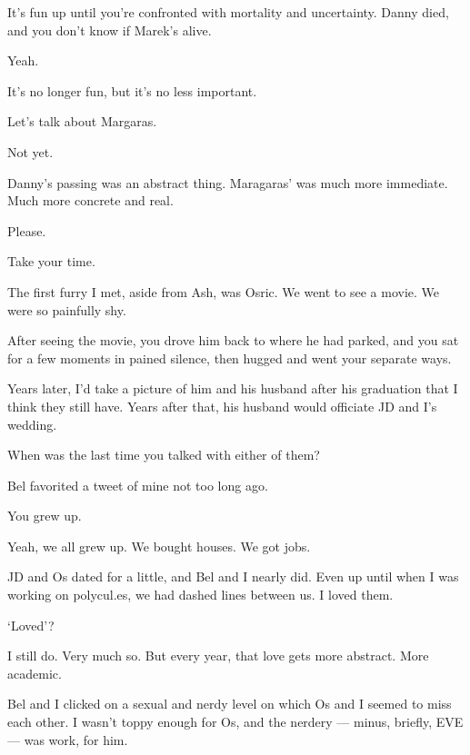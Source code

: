 \begin{leftcolumn}
\begin{ally}
It's fun up until you're confronted with mortality and uncertainty. Danny died, and you don't know if Marek's alive.
\end{ally}
Yeah.

It's no longer fun, but it's no less important.

\begin{ally}
Let's talk about Margaras.
\end{ally}
Not yet.

\begin{ally}
Danny's passing was an abstract thing. Maragaras' was much more immediate. Much more concrete and real.
\end{ally}
Please.

\begin{ally}
Take your time.
\end{ally}
\newpage

\noindent The first furry I met, aside from Ash, was Osric. We went to see a movie. We were so painfully shy.

\begin{ally}
After seeing the movie, you drove him back to where he had parked, and you sat for a few moments in pained silence, then hugged and went your separate ways.
\end{ally}
Years later, I'd take a picture of him and his husband after his graduation that I think they still have. Years after that, his husband would officiate JD and I's wedding.

\begin{ally}
When was the last time you talked with either of them?
\end{ally}
Bel favorited a tweet of mine not too long ago.

\begin{ally}
You grew up.
\end{ally}
Yeah, we all grew up. We bought houses. We got jobs.

JD and Os dated for a little, and Bel and I nearly did. Even up until when I was working on polycul.es, we had dashed lines between us. I loved them.

\begin{ally}
`Loved'?
\end{ally}
I still do. Very much so. But every year, that love gets more abstract. More academic.

Bel and I clicked on a sexual and nerdy level on which Os and I seemed to miss each other. I wasn't toppy enough for Os, and the nerdery --- minus, briefly, EVE --- was work, for him.


\end{leftcolumn}

